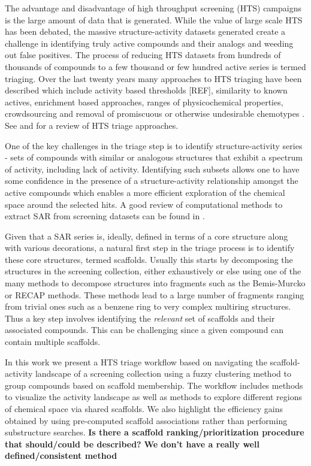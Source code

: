 \documentclass[journal=jacsat,manuscript=article]{achemso}
\begin{document}
The advantage and disadvantage of high throughput screening (HTS) campaigns is
the large amount of data that is generated. While the value of large scale HTS
has been debated\cite{Macarron:2011qv}, the massive structure-activity
datasets generated create a challenge in identifying truly active compounds and
their analogs and weeding out false positives. The process of reducing HTS
datasets from hundreds of thousands of compounds to a few thousand or few
hundred active series is termed triaging. Over the last twenty years many
approaches to HTS triaging have been described which include activity based
thresholds [REF], similarity to known actives, enrichment based
approaches\cite{Varin2010CSE,Pu:2012wf}, ranges of physicochemical
properties\cite{Cox:2012qy}, crowdsourcing\cite{Peng:2013qp} and removal of
promiscuous or otherwise undesirable chemotypes \cite{Dahlin:2014fp}. See
\citeauthor{Shun:2011sy} and \citeauthor{Langer:2009mw} for a review of HTS
triage approaches.  

One of the key challenges in the triage step is to identify structure-activity
series - sets of compounds with similar or analogous structures that exhibit a
spectrum of activity, including lack of activity. Identifying such subsets allows one to have some
confidence in the presence of a structure-activity relationship amongst the
active compounds which enables a more efficient exploration of the chemical
space around the selected hits. A good review of computational methods to extract SAR from screening datasets can be found in \citeauthor{Wawer2010review}. 

Given that a SAR series is, ideally, defined in terms of a core structure along
with various decorations, a natural first step in the triage process is to
identify these core structures, termed scaffolds. Usually this starts by
decomposing the structures in the screening collection, either exhaustively or
else using one of the many methods to decompose structures into fragments such
as the Bemis-Murcko\cite{BemisMurcko1999,BemisMurcko1996} or RECAP
methods\cite{Lewell:1998aa}. These methods lead to a large number of
fragments ranging from trivial ones such as a benzene ring to very complex
multiring structures. Thus a key step involves identifying the \emph{relevant} set of
scaffolds and their associated compounds. This can be challenging since a given
compound can contain multiple scaffolds.

In this work we present a HTS triage workflow based on navigating the
scaffold-activity landscape of a screening collection using a fuzzy clustering method to group compounds 
based on scaffold membership. The workflow includes
methods to visualize the activity landscape as well as methods to explore
different regions of chemical space via shared scaffolds. We also highlight the
efficiency gains obtained by using pre-computed scaffold associations rather
than performing substructure searches. \textbf{Is there a scaffold
  ranking/prioritization procedure that should/could be described?}
\textbf{We don't have a really well defined/consistent method}
\end{document}
